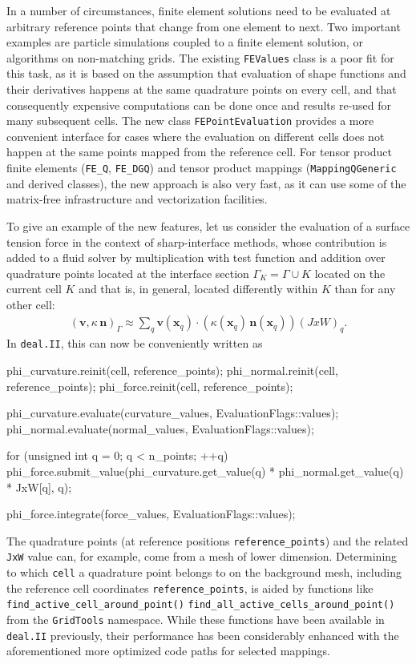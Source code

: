 \documentclass{ansarticle-preprint}
\newcommand{\specialword}[1]{\texttt{#1}}
\newcommand{\dealii}{{\specialword{deal.II}}\xspace}
\begin{document}
In a number of circumstances, finite element solutions need to be evaluated at
arbitrary reference points that change from one element to next. Two important
examples are particle simulations coupled to a finite element solution, or
algorithms on non-matching grids. The existing \texttt{FEValues} class is a poor
fit for this task, as it is based on the assumption that evaluation of
shape functions and their derivatives happens at the same quadrature
points on every cell, and that consequently expensive computations can
be done once and results re-used for many subsequent cells. The new class
\texttt{FEPointEvaluation} provides a more convenient interface for
cases where the evaluation on different cells does not happen at the
same points mapped from the reference cell.
For tensor product finite elements (\texttt{FE\_Q}, \texttt{FE\_DGQ})
and tensor product mappings (\texttt{MappingQGeneric} and derived classes),
the new approach is also very fast, as it can use some of the matrix-free
infrastructure and vectorization facilities.

To give an example of the new features, let us consider the evaluation of a
surface tension force in the context of sharp-interface methods, whose
contribution is added to a fluid solver by multiplication with test function
and addition over quadrature points located at the interface section
$\Gamma_K=\Gamma \cup K$ located on the current cell $K$ and that is,
in general, located differently within $K$ than for any other cell:
\begin{align*}
\left(\mathbf{v}, \kappa \, \mathbf{n}\right)_\Gamma
\approx
\sum_q \mathbf{v}(\mathbf{x}_q) \cdot \left(\kappa(\mathbf{x}_q) \, \mathbf{n}(\mathbf{x}_q)\right) (JxW)_q.
\end{align*}
In \dealii{}, this can now be conveniently written as
\begin{c++}
phi_curvature.reinit(cell, reference_points);
phi_normal.reinit(cell, reference_points);
phi_force.reinit(cell, reference_points);

phi_curvature.evaluate(curvature_values, EvaluationFlags::values);
phi_normal.evaluate(normal_values, EvaluationFlags::values);

for (unsigned int q = 0; q < n_points; ++q)
  phi_force.submit_value(phi_curvature.get_value(q) *
                         phi_normal.get_value(q) * JxW[q], q);
                          
phi_force.integrate(force_values, EvaluationFlags::values);
\end{c++}
The quadrature points (at reference positions
\texttt{reference\_points}) and the related \texttt{JxW} value can,
for example, come from
a mesh of lower dimension. Determining to which \texttt{cell} a quadrature
point belongs to on the background mesh, including the reference cell
coordinates \texttt{reference\_\allowbreak points}, is aided by functions like
\texttt{find\_active\_cell\_around\_point()}
\texttt{find\_all\_active\_cells\_\allowbreak around\_\allowbreak point()} from the \texttt{GridTools} namespace. While these
functions have been available in \dealii{} previously, their performance has
been considerably enhanced with the aforementioned more optimized code paths
for selected mappings.
\end{document}
